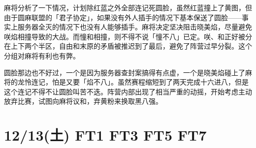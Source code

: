 麻将分析了一下情况，计划除红蓝之外全部连记死圆脸，虽然红蓝撞上了黄图，但由于圆麻联盟的「君子协定」，如果没有外人插手的情况下基本保送了圆脸——事实上服务器全灭的情况下也没有人能够插手。麻将决定坚决阻击晓美焰，尽量避免咲焰相撞导致的大战。而憧和相撞，则不得不说「憧不八」已定。咲、和正好被分在上下两个半区，自由和末原的矛盾被推迟到了最后，避免了阵营过早分裂。这个分组对麻将有利也有弊。

圆脸那边也不好过，一个是因为服务器查封案搞得有点虚，一个是晓美焰碰上了麻将的龙怜连记，怕是又要「焰不八」。虽然赛程缩短到了两天完成十六进八，但是这个连记不得不让圆脸叫苦不迭。阵营内部出现了相当严重的动摇，开始考虑主动放弃比赛，试图向麻将议和，弃黄粉来换取黑八强。

\section{12/13(土) FT1 FT3 FT5 FT7}



